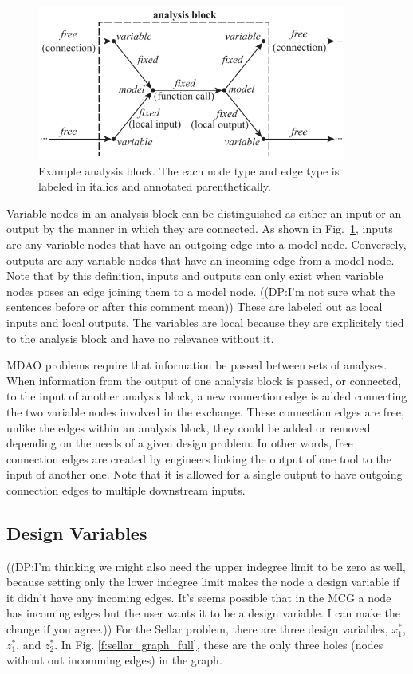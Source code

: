 \begin{figure}[htb!]
    \begin{center}
    \includegraphics[width=4in]{images/analysis_block}
    \end{center}
    \vspace{-10pt}
\caption{Example analysis block. The each node type and edge type is labeled in italics and annotated parenthetically.}
\label{f:analysis block}
\end{figure}

	Variable nodes in an analysis block can be distinguished as either an input or an output by the manner in which they are connected. As shown in Fig.~\ref{f:analysis block}, inputs are any variable nodes that have an outgoing edge into a model 
	node. Conversely, outputs are any variable nodes that have an incoming edge from a model node. 
	Note that by this definition, inputs and outputs can only exist when variable nodes poses an 
	edge joining them to a model node. 
	((DP:I'm not sure what the sentences before or after this comment mean))
	These are labeled out as 
	local inputs and local outputs. The variables are local because they are explicitely tied
	to the analysis block and have no relevance without it. 

MDAO problems require that information be passed between sets of analyses. When 
information from the output of one analysis block is passed, or connected, to the 
input of another analysis block, a new connection edge is added connecting the two 
variable nodes involved in the exchange. These connection edges are free, unlike the edges 
within an analysis block, they could be added or removed depending on the needs
of a given design problem. In other words, free connection edges are created by 
engineers linking the output of one tool to the input of another one. Note that 
it is allowed for a single output to have outgoing connection edges to multiple 
downstream inputs. 

\subsection{Design Variables}
((DP:I'm thinking we might also need the upper indegree limit to be zero as well, because setting only the lower indegree limit makes the node a design variable if it didn't have any incoming edges. It's seems possible that in the MCG a node has incoming edges but the user wants it to be a design variable. I can make the change if you agree.))
For the Sellar problem, there are three design variables, $x_1^*$, $z_1^*$, and $z_2^*$. In Fig. 
\ref{f:sellar_graph_full}, these are the only three holes (nodes without out 
incomming edges) in the graph. 

